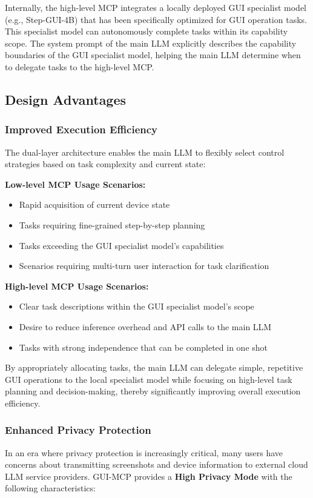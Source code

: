 Internally, the high-level MCP integrates a locally deployed GUI specialist model (e.g., Step-GUI-4B) that has been specifically optimized for GUI operation tasks. This specialist model can autonomously complete tasks within its capability scope. The system prompt of the main LLM explicitly describes the capability boundaries of the GUI specialist model, helping the main LLM determine when to delegate tasks to the high-level MCP.

\subsection{Design Advantages}

\subsubsection{Improved Execution Efficiency}
The dual-layer architecture enables the main LLM to flexibly select control strategies based on task complexity and current state:

\noindent\textbf{Low-level MCP Usage Scenarios:}
\begin{itemize}
    \item Rapid acquisition of current device state
    \item Tasks requiring fine-grained step-by-step planning
    \item Tasks exceeding the GUI specialist model's capabilities
    \item Scenarios requiring multi-turn user interaction for task clarification
\end{itemize}

\noindent\textbf{High-level MCP Usage Scenarios:}
\begin{itemize}
    \item Clear task descriptions within the GUI specialist model's scope
    \item Desire to reduce inference overhead and API calls to the main LLM
    \item Tasks with strong independence that can be completed in one shot
\end{itemize}

By appropriately allocating tasks, the main LLM can delegate simple, repetitive GUI operations to the local specialist model while focusing on high-level task planning and decision-making, thereby significantly improving overall execution efficiency.

\subsubsection{Enhanced Privacy Protection}
In an era where privacy protection is increasingly critical, many users have concerns about transmitting screenshots and device information to external cloud LLM service providers. GUI-MCP provides a \textbf{High Privacy Mode} with the following characteristics:

